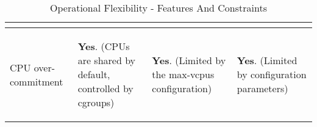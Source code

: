 \begin{table}[H]
\begin{center}
\begin{tabular}{ | p{3.25cm} | p{3.25cm} | p{3.25cm} | p{3.25cm} |}
\begin{flushleft}
     \end{flushleft} \\ \hline
       \begin{flushleft}
     CPU over-commitment
     \end{flushleft} & \begin{flushleft}
     \textbf{Yes}. (CPUs are shared by default, controlled by cgroups)
     \end{flushleft} & \begin{flushleft}
     \textbf{Yes}. (Limited by the max-vcpus configuration) 
     \end{flushleft}& \begin{flushleft}
     \textbf{Yes}. (Limited by configuration parameters)
     \end{flushleft} \\ \hline
     \end{tabular}
\end{center}
\caption{Operational Flexibility - Features And Constraints}
\label{table:features}
\end{table}
